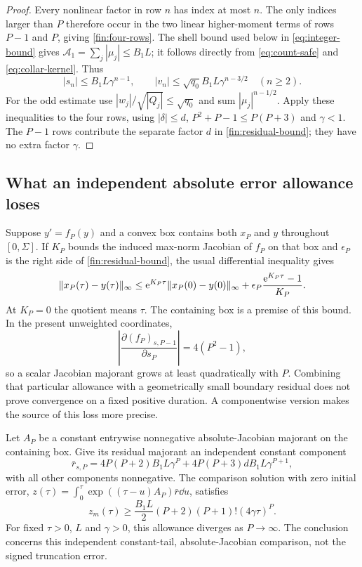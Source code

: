 \begin{proof}
Every nonlinear factor in row $n$ has index at most $n$. The only
indices larger than $P$ therefore occur in the two linear higher-moment
terms of rows $P-1$ and $P$, giving \eqref{fin:four-rows}.
The shell bound used below in \eqref{eq:integer-bound} gives
$\mathcal A_1=\sum_j|\mu_j|\le B_1L$; it follows directly from
\eqref{eq:count-safe} and \eqref{eq:collar-kernel}. Thus
\[
 |s_n|\le B_1L\gamma^{n-1},\qquad
 |v_n|\le\sqrt{q_0}B_1L\gamma^{n-3/2}\quad(n\ge2).
\]
For the odd estimate use
$|w_j|/\sqrt{|Q_j|}\le\sqrt{q_0}$ and sum
$|\mu_j|^{n-1/2}$. Apply these inequalities to the four rows,
using $|\delta|\le d$, $P^2+P-1\le P(P+3)$ and $\gamma<1$.
The $P-1$ rows contribute the separate factor $d$ in
\eqref{fin:residual-bound}; they have no extra factor $\gamma$.
\end{proof}

\subsection{What an independent absolute error allowance loses}

Suppose $y'=f_P(y)$ and a convex box contains both $x_P$ and $y$
throughout $[0,\Sigma]$. If $K_P$ bounds the induced max-norm Jacobian
of $f_P$ on that box and $\epsilon_P$ is the right side of
\eqref{fin:residual-bound}, the usual differential inequality gives
\begin{equation}
 \|x_P(\tau)-y(\tau)\|_\infty
 \le \mathrm e^{K_P\tau}\|x_P(0)-y(0)\|_\infty
       +\epsilon_P\frac{\mathrm e^{K_P\tau}-1}{K_P}.
 \label{fin:gronwall}
\end{equation}
At $K_P=0$ the quotient means $\tau$. The containing box is a
premise of this bound. In the present unweighted coordinates,
\[
 \left|\frac{\partial (f_P)_{s,P-1}}{\partial s_P}\right|
       =4(P^2-1),
\]
so a scalar Jacobian majorant grows at least quadratically with $P$.
Combining that particular allowance with a geometrically small boundary
residual does not prove convergence on a fixed positive duration.
A componentwise version makes the source of this loss more precise.

\begin{proposition}
\label{fin:positive-box}
Let $A_P$ be a constant entrywise nonnegative absolute-Jacobian majorant
on the containing box. Give its residual majorant an independent constant
component
\[
 \bar r_{s,P}=4P(P+2)B_1L\gamma^P
             +4P(P+3)dB_1L\gamma^{P+1},
\]
with all other components nonnegative. The comparison solution with
zero initial error,
$z(\tau)=\int_0^\tau\exp((\tau-u)A_P)\bar r\dd u$, satisfies
\begin{equation}
 z_m(\tau)\ge\frac{B_1L}{2}(P+2)(P+1)!(4\gamma\tau)^P.
 \label{fin:path-lower}
\end{equation}
For fixed $\tau>0$, $L$ and $\gamma>0$, this allowance diverges as
$P\to\infty$. The conclusion concerns this independent constant-tail,
absolute-Jacobian comparison, not the signed truncation error.
\end{proposition}

